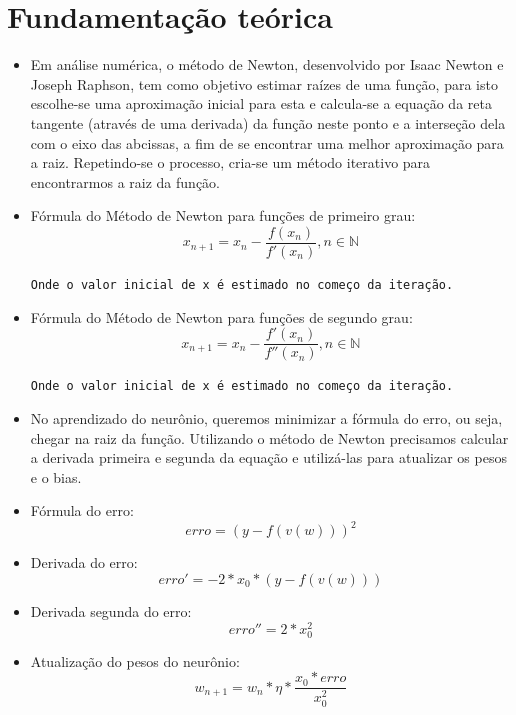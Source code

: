 \documentclass[12pt]{article}
\begin{document}
\section{Fundamentação teórica}
\begin{itemize}
	 \item Em análise numérica, o método de Newton, desenvolvido por Isaac Newton e Joseph Raphson, tem como objetivo estimar raízes de uma função, para isto escolhe-se uma aproximação inicial para esta e calcula-se a equação da reta tangente (através de uma derivada) da função neste ponto e a interseção dela com o eixo das abcissas, a fim de se encontrar uma melhor aproximação para a raiz. Repetindo-se o processo, cria-se um método iterativo para encontrarmos a raiz da função.
    \item Fórmula do Método de Newton para funções de primeiro grau:
    \begin{equation}
        x_{n+1} = x_n - \frac{f(x_n)}{f'(x_n)}, n \in \mathbb{N}
    \end{equation}
    \begin{center}
        \small{\texttt{Onde o valor inicial de x é estimado no começo da iteração.}}
    \end{center}
    \item Fórmula do Método de Newton para funções de segundo grau:
    \begin{equation}
        x_{n+1} = x_n - \frac{f'(x_n)}{f''(x_n)}, n \in \mathbb{N}
    \end{equation}
    \begin{center}
        \small{\texttt{Onde o valor inicial de x é estimado no começo da iteração.}}
    \end{center}
    
    \item No aprendizado do neurônio, queremos minimizar a fórmula do erro, ou seja, chegar na raiz da função. Utilizando o método de Newton precisamos calcular a derivada primeira e segunda da equação e utilizá-las para atualizar os pesos e o bias.
    
    \item Fórmula do erro:
    \begin{equation}
        erro = (y - f(v(w)))^2
    \end{equation}
    
    \item Derivada do erro:
    \begin{equation}
        erro' = - 2 * x_0 * (y - f(v(w)))
    \end{equation}
    
    \item Derivada segunda do erro:
    \begin{equation}
        erro'' = 2 * x_0^2
    \end{equation}
    
    \item Atualização do pesos do neurônio:
    \begin{equation}
        w_{n+1} = w_n * \eta * \frac{x_0 * erro}{x_0^2}
    \end{equation}
\end{itemize}
\end{document}
